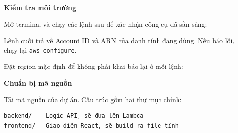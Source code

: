 \vspace{0.5em}\noindent\textbf{Kiểm tra môi
trường}\par

Mở terminal và chạy các lệnh sau để xác nhận công cụ đã sẵn sàng:

\begin{Shaded}
\begin{Highlighting}[]
 
 
\end{Highlighting}
\end{Shaded}

Lệnh cuối trả về Account ID và ARN của danh tính đang dùng. Nếu báo lỗi,
chạy lại \texttt{aws\ configure}.

Đặt region mặc định để không phải khai báo lại ở mỗi lệnh:

\begin{Shaded}
\begin{Highlighting}[]
 \OperatorTok{=}
\end{Highlighting}
\end{Shaded}

\vspace{0.5em}\noindent\textbf{Chuẩn bị mã nguồn}\par

Tải mã nguồn của dự án. Cấu trúc gồm hai thư mục chính:

\begin{verbatim}
backend/    Logic API, sẽ đưa lên Lambda
frontend/   Giao diện React, sẽ build ra file tĩnh
\end{verbatim}
